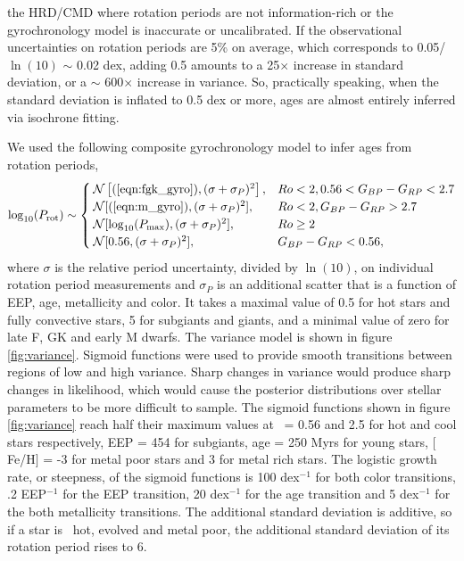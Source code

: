 the HRD/CMD where rotation periods are not information-rich or the
gyrochronology model is inaccurate or uncalibrated.
If the observational uncertainties on rotation periods are 5\% on average,
which corresponds to 0.05/$\ln(10)$ $\sim$ 0.02 dex, adding 0.5 amounts to
a 25$\times$ increase in standard deviation, or a $\sim$ 600$\times$ increase
in variance.
So, practically speaking, when the standard deviation is inflated to 0.5 dex
or more, ages are almost entirely inferred via isochrone fitting.


We used the following composite gyrochronology model to infer ages from
rotation periods,
\begin{equation}
    \log_{10}(P_\mathrm{rot}) \sim \begin{cases}
        \mathcal{N}\left[(\ref{eqn:fgk_gyro}), (\sigma+\sigma_P)^2\right], & Ro < 2,
        0.56 < G_{BP} - G_{RP} < 2.7 \\
        \mathcal{N}[(\ref{eqn:m_gyro}), (\sigma+\sigma_P)^2], & Ro < 2,
        G_{BP} - G_{RP} > 2.7 \\
        \mathcal{N}[\log_{10}(P_\mathrm{max}), (\sigma+\sigma_P)^2],& Ro \geq 2 \\
        \mathcal{N}[0.56, (\sigma+\sigma_P)^2],& G_{BP} - G_{RP} < 0.56,
    \end{cases}
\label{eqn:gyro}
\end{equation}
where $\sigma$ is the relative period uncertainty, divided by $\ln(10)$, on
individual rotation period measurements and $\sigma_P$ is an additional
scatter that is a function of EEP, age, metallicity and color.
It takes a maximal value of 0.5 for hot stars and fully convective stars, 5
for subgiants and giants, and a minimal value of zero for late F, GK and early
M dwarfs.
The variance model is shown in figure \ref{fig:variance}.
Sigmoid functions were used to provide smooth transitions between regions of
low and high variance.
Sharp changes in variance would produce sharp changes in likelihood, which
would cause the posterior distributions over stellar parameters to be more
difficult to sample.
The sigmoid functions shown in figure \ref{fig:variance} reach half their
maximum values at \gcolor\ = 0.56 and 2.5 for hot and cool stars respectively,
EEP = 454 for subgiants, age = 250 Myrs for young stars, $[$Fe/H$]$ = -3 for
metal poor stars and 3 for metal rich stars.
The logistic growth rate, or steepness, of the sigmoid functions is 100
dex$^{-1}$ for both color transitions, .2 EEP$^{-1}$ for the EEP transition,
20 dex$^{-1}$ for the age transition and 5 dex$^{-1}$ for the both metallicity
transitions.
The additional standard deviation is additive, so if a star is \eg\ hot,
evolved and metal poor, the additional standard deviation of its rotation
period rises to 6.

